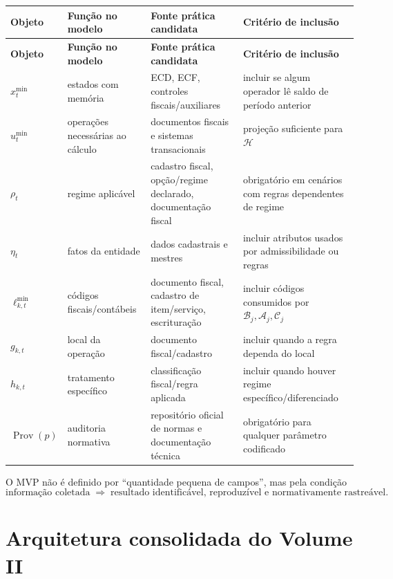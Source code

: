 \documentclass[11pt,a4paper]{article}
\newcommand{\cB}{\mathcal{B}}
\newcommand{\cA}{\mathcal{A}}
\newcommand{\cC}{\mathcal{C}}
\newcommand{\cH}{\mathcal{H}}
\newcommand{\Prov}{\operatorname{Prov}}
\begin{document}
\renewcommand{\arraystretch}{1.15}
\small
\begin{longtable}{>{\raggedright\arraybackslash}p{2.0cm}>{\raggedright\arraybackslash}p{2.9cm}>{\raggedright\arraybackslash}p{4.1cm}>{\raggedright\arraybackslash}p{4.8cm}}
\toprule
\textbf{Objeto} & \textbf{Função no modelo} & \textbf{Fonte prática candidata} & \textbf{Critério de inclusão}\\
\midrule
\endfirsthead
\toprule
\textbf{Objeto} & \textbf{Função no modelo} & \textbf{Fonte prática candidata} & \textbf{Critério de inclusão}\\
\midrule
\endhead
$x_t^{\min}$ & estados com memória & ECD, ECF, controles fiscais/auxiliares & incluir se algum operador lê saldo de período anterior\\
$u_t^{\min}$ & operações necessárias ao cálculo & documentos fiscais e sistemas transacionais & projeção suficiente para $\cH$\\
$\rho_t$ & regime aplicável & cadastro fiscal, opção/regime declarado, documentação fiscal & obrigatório em cenários com regras dependentes de regime\\
$\eta_t$ & fatos da entidade & dados cadastrais e mestres & incluir atributos usados por admissibilidade ou regras\\
$\ell_{k,t}^{\min}$ & códigos fiscais/contábeis & documento fiscal, cadastro de item/serviço, escrituração & incluir códigos consumidos por $\cB_j,\cA_j,\cC_j$\\
$g_{k,t}$ & local da operação & documento fiscal/cadastro & incluir quando a regra dependa do local\\
$h_{k,t}$ & tratamento específico & classificação fiscal/regra aplicada & incluir quando houver regime específico/diferenciado\\
$\Prov(p)$ & auditoria normativa & repositório oficial de normas e documentação técnica & obrigatório para qualquer parâmetro codificado\\
\bottomrule
\end{longtable}
\normalsize

\begin{formalizacao}
O MVP não é definido por ``quantidade pequena de campos'', mas pela condição
\[
\text{informação coletada}
\;\Longrightarrow\;
\text{resultado identificável, reproduzível e normativamente rastreável}.
\]
\end{formalizacao}

\section{Arquitetura consolidada do Volume II}
\end{document}
